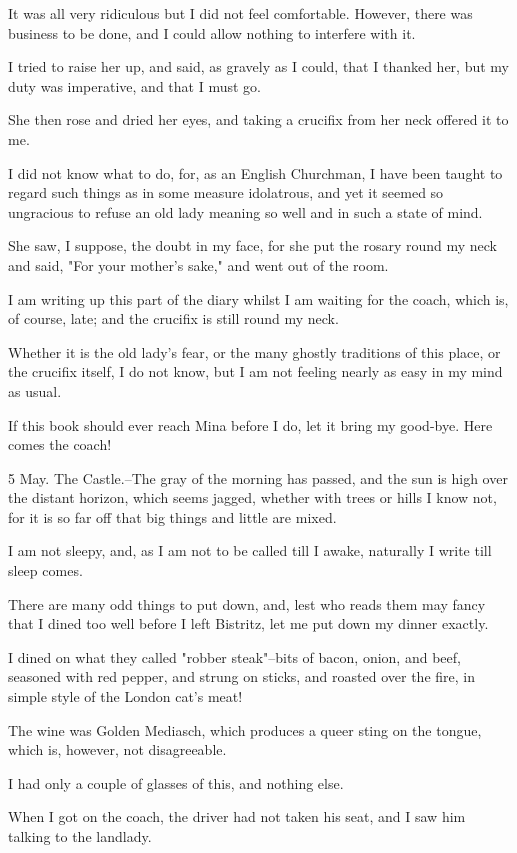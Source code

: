 It was all very ridiculous but I did not feel comfortable. However, there was business to be done, and I could allow nothing to interfere with it. 

I tried to raise her up, and said, as gravely as I could, that I thanked her, but my duty was imperative, and that I must go. 

She then rose and dried her eyes, and taking a crucifix from her neck offered it to me. 

I did not know what to do, for, as an English Churchman, I have been taught to regard such things as in some measure idolatrous, and yet it seemed so ungracious to refuse an old lady meaning so well and in such a state of mind. 

She saw, I suppose, the doubt in my face, for she put the rosary round my neck and said, "For your mother's sake," and went out of the room. 

I am writing up this part of the diary whilst I am waiting for the coach, which is, of course, late; and the crucifix is still round my neck. 

Whether it is the old lady's fear, or the many ghostly traditions of this place, or the crucifix itself, I do not know, but I am not feeling nearly as easy in my mind as usual. 

If this book should ever reach Mina before I do, let it bring my good-bye. Here comes the coach! 

5 May. The Castle.--The gray of the morning has passed, and the sun is high over the distant horizon, which seems jagged, whether with trees or hills I know not, for it is so far off that big things and little are mixed. 

I am not sleepy, and, as I am not to be called till I awake, naturally I write till sleep comes. 

There are many odd things to put down, and, lest who reads them may fancy that I dined too well before I left Bistritz, let me put down my dinner exactly. 

I dined on what they called "robber steak"--bits of bacon, onion, and beef, seasoned with red pepper, and strung on sticks, and roasted over the fire, in simple style of the London cat's meat! 

The wine was Golden Mediasch, which produces a queer sting on the tongue, which is, however, not disagreeable. 

I had only a couple of glasses of this, and nothing else. 

When I got on the coach, the driver had not taken his seat, and I saw him talking to the landlady. 

